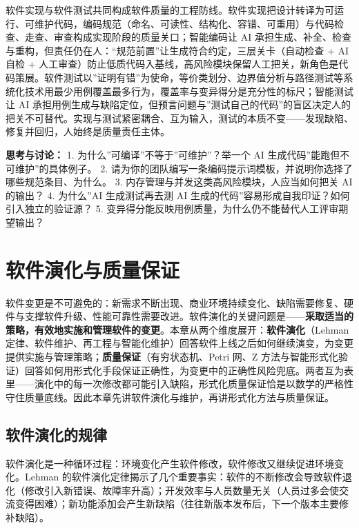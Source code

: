 \documentclass[12pt,a4paper,twoside,openany]{ctexbook}
\numberwithin{figure}{chapter}
\numberwithin{table}{chapter}
\begin{document}
软件实现与软件测试共同构成软件质量的工程防线。软件实现把设计转译为可运行、可维护代码，编码规范（命名、可读性、结构化、容错、可重用）与代码检查、走查、审查构成实现阶段的质量关口；智能编码让
AI
承担生成、补全、检查与重构，但责任仍在人：``规范前置''让生成符合约定，三层关卡（自动检查
+ AI 自检 +
人工审查）防止低质代码入基线，高风险模块保留人工把关，新角色是代码策展。软件测试以''证明有错''为使命，等价类划分、边界值分析与路径测试等系统化技术用最少用例覆盖最多行为，覆盖率与变异得分是充分性的标尺；智能测试让
AI
承担用例生成与缺陷定位，但预言问题与''测试自己的代码''的盲区决定人的把关不可替代。实现与测试紧密耦合、互为输入，测试的本质不变------发现缺陷、修复并回归，人始终是质量责任主体。

\textbf{思考与讨论：} 1. 为什么''可编译''不等于''可维护''？举一个 AI
生成代码''能跑但不可维护''的具体例子。 2.
请为你的团队编写一条编码提示词模板，并说明你选择了哪些规范条目、为什么。
3. 内存管理与并发这类高风险模块，人应当如何把关 AI 的输出？ 4.
为什么''AI 生成测试再去测 AI
生成的代码''容易形成自我印证？如何引入独立的验证源？ 5.
变异得分能反映用例质量，为什么仍不能替代人工评审期望输出？

\chapter{软件演化与质量保证}\label{ux8f6fux4ef6ux6f14ux5316ux4e0eux8d28ux91cfux4fddux8bc1}

软件变更是不可避免的：新需求不断出现、商业环境持续变化、缺陷需要修复、硬件与支撑软件升级、性能可靠性需要改进。软件演化的关键问题是------\textbf{采取适当的策略，有效地实施和管理软件的变更}。本章从两个维度展开：\textbf{软件演化}（Lehman
定律、软件维护、再工程与智能化维护）回答软件上线之后如何继续演变，为变更提供实施与管理策略；\textbf{质量保证}（有穷状态机、Petri
网、Z
方法与智能形式化验证）回答如何用形式化手段保证正确性，为变更中的正确性风险兜底。两者互为表里------演化中的每一次修改都可能引入缺陷，形式化质量保证恰是以数学的严格性守住质量底线。因此本章先讲软件演化与维护，再讲形式化方法与质量保证。

\section{软件演化的规律}\label{ux8f6fux4ef6ux6f14ux5316ux7684ux89c4ux5f8b}

软件演化是一种循环过程：环境变化产生软件修改，软件修改又继续促进环境变化。Lehman
的软件演化定律揭示了几个重要事实：软件的不断修改会导致软件退化（修改引入新错误、故障率升高）；开发效率与人员数量无关（人员过多会使交流变得困难）；新功能添加会产生新缺陷（往往新版本发布后，下一个版本主要修补缺陷）。
\end{document}
